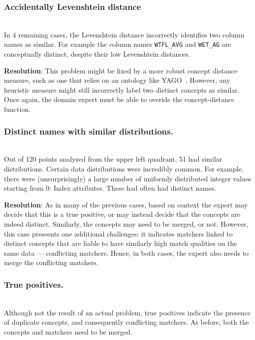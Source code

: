 \smallskip
\subsubsection{Accidentally Levenshtein distance}~\\
In 4 remaining cases, the Levenshtein distance incorrectly identifies two column names as similar.  For example the column names \texttt{WTFL\_AVG} and \texttt{WET\_AG} are conceptually distinct, despite their low Levenshtein distances.

\textbf{Resolution}: 
This problem might be fixed by a more robust concept distance measure, such as one that relies on an ontology like YAGO~\cite{fabian2007yago}.  
However, any heuristic measure might still incorrectly label two distinct concepts as similar.  
Once again, the domain expert must be able to overide the concept-distance function.


\smallskip
\subsubsection{Distinct names with similar distributions.}~\\
Out of 120 points analyzed from the upper left quadrant, 51 had similar distributions.
Certain data distributions were incredibly common.
For example, there were (unsurprisingly) a large number of uniformly distributed integer values starting from 0: Index attributes.
These had often had distinct names.

\textbf{Resolution}:
As in many of the previous cases, based on context the expert may decide that this is a true positive, or may instead decide that the concepts are indeed distinct.
Similarly, the concepts may need to be merged, or not.
However, this case preseents one additional challenges: it indicates  matchers linked to distinct concepts that are liable to have similarly high match qualities on the same data --- conflicting matchers.
Hence, in both cases, the expert also needs to merge the conflicting matchers.

\smallskip
\subsubsection{True positives.}~\\
Although not the result of an actual problem, true positives indicate the presence of duplicate concepts, and consequently conflicting matchers.  As before, both the concepts and matchers need to be merged.


